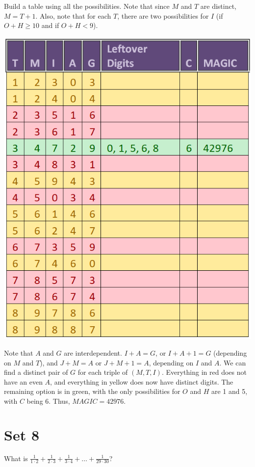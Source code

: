 \documentclass[11pt]{article}
\begin{document}
\begin{solution}
Build a table using all the possibilities. Note that since $M$ and $T$ are distinct, $M=T+1$. Also, note that for each $T$, there are two possibilities for $I$ (if $O+H \geq 10$ and if $O+H < 9$).
\begin{center}
    \includegraphics[scale=0.5]{guts_table}
\end{center}
Note that $A$ and $G$ are interdependent. $I+A=G$, or $I+A+1=G$ (depending on $M$ and $T$), and $J+M=A$ or $J+M+1=A$, depending on $I$ and $A$. We can find a distinct pair of $G$ for each triple of $(M, T, I)$. Everything in red does not have an even $A$, and everything in yellow does now have distinct digits. The remaining option is in green, with the only possibilities for $O$ and $H$ are 1 and 5, with $C$ being 6. Thus,  $MAGIC=\boxed{42976}$.
\end{solution}


\newpage
\section*{Set 8}
\begin{problem}
What is $\frac{1}{1\cdot2}+\frac{1}{2\cdot3} + \frac{1}{3\cdot4} + \dots + \frac{1}{29\cdot30}$?
\end{problem}
\end{document}
